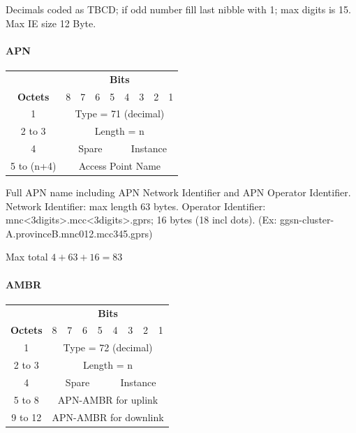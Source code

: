 Decimals coded as TBCD; if odd number fill last nibble with 1; max digits is 15.\\
Max IE size 12 Byte.

\paragraph{APN}

\begin{tabular}{c|p{1cm}|p{1cm}|p{1cm}|p{1cm}|p{1cm}|p{1cm}|p{1cm}|p{1cm}|}
\multicolumn{1}{c}{} & \multicolumn{8}{c}{\textbf{Bits}} \\
\cline{2-9} \textbf{Octets} & 8 & 7 & 6 & 5 & 4 & 3 & 2 & 1 \\ 
\cline{2-9} 1 & \multicolumn{8}{c|}{Type = 71 (decimal)} \\ 
\cline{2-9} 2 to 3 & \multicolumn{8}{c|}{Length = n}  \\ 
\cline{2-9} 4 & \multicolumn{4}{c|}{Spare} & \multicolumn{4}{c|}{Instance} \\ 
\cline{2-9} 5 to (n+4) & \multicolumn{8}{c|}{Access Point Name} \\ 
\cline{2-9}
\end{tabular} 

Full APN name including APN Network Identifier and APN Operator Identifier.
Network Identifier: max length 63 bytes.
Operator Identifier: mnc<3digits>.mcc<3digits>.gprs; 16 bytes (18 incl dots).
(Ex: ggsn-cluster-A.provinceB.mnc012.mcc345.gprs)

Max total $4+63+16=83$

\paragraph{AMBR}

\begin{tabular}{c|p{1cm}|p{1cm}|p{1cm}|p{1cm}|p{1cm}|p{1cm}|p{1cm}|p{1cm}|}
\multicolumn{1}{c}{} & \multicolumn{8}{c}{\textbf{Bits}} \\
\cline{2-9} \textbf{Octets} & 8 & 7 & 6 & 5 & 4 & 3 & 2 & 1 \\ 
\cline{2-9} 1 & \multicolumn{8}{c|}{Type = 72 (decimal)} \\ 
\cline{2-9} 2 to 3 & \multicolumn{8}{c|}{Length = n}  \\ 
\cline{2-9} 4 & \multicolumn{4}{c|}{Spare} & \multicolumn{4}{c|}{Instance} \\ 
\cline{2-9} 5 to 8 & \multicolumn{8}{c|}{APN-AMBR for uplink} \\ 
\cline{2-9} 9 to 12 & \multicolumn{8}{c|}{APN-AMBR for downlink} \\ 
\cline{2-9}
\end{tabular} 


